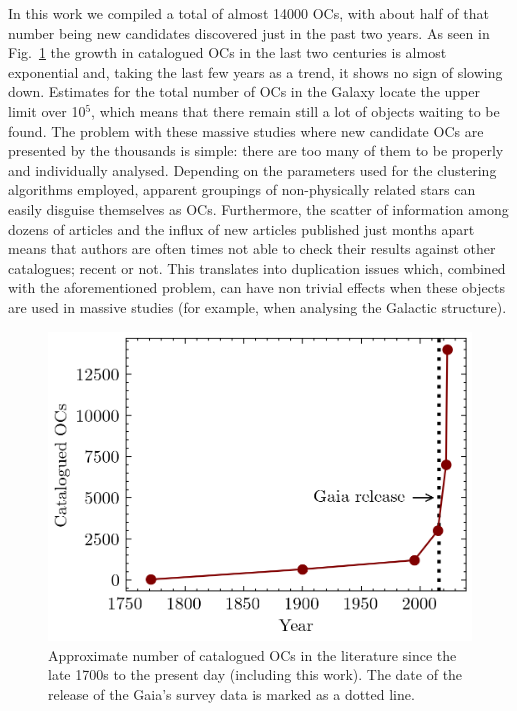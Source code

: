 \documentclass[fleqn,usenatbib]{mnras}
\begin{document}
In this work we compiled a total of almost 14000 OCs, with about half of that
number being new candidates discovered just in the past two years.
As seen in Fig.~\ref{fig:catalogued_ocs} the growth in catalogued OCs
in the last two centuries is almost exponential and, taking the last few years
as a trend, it shows no sign of slowing down. Estimates for the total number
of OCs in the Galaxy locate the upper limit over 10$^{5}$, which means that
there remain still a lot of objects waiting to be found.
%
The problem with these massive studies where new candidate OCs are presented by
the thousands is simple: there are too many of them to be properly and
individually analysed. Depending on the parameters used for the clustering
algorithms employed, apparent groupings of non-physically related stars can
easily disguise themselves as OCs.
Furthermore, the scatter of information among dozens of articles and the influx
of new articles published just months apart means that authors are often times
not able to check their results against other catalogues; recent or not. This
translates into duplication issues which, combined with the aforementioned
problem, can have non trivial effects when these objects are used in massive
studies (for example, when analysing the Galactic structure).

\begin{figure}
	\includegraphics[width=\columnwidth]{figs/catalogued_ocs.png}
    \caption{Approximate number of catalogued OCs in the literature since the
    late 1700s to the present day (including this work). The date of the
    release of the Gaia's survey data is marked as a dotted line.}
    \label{fig:catalogued_ocs}
\end{figure}
\end{document}
